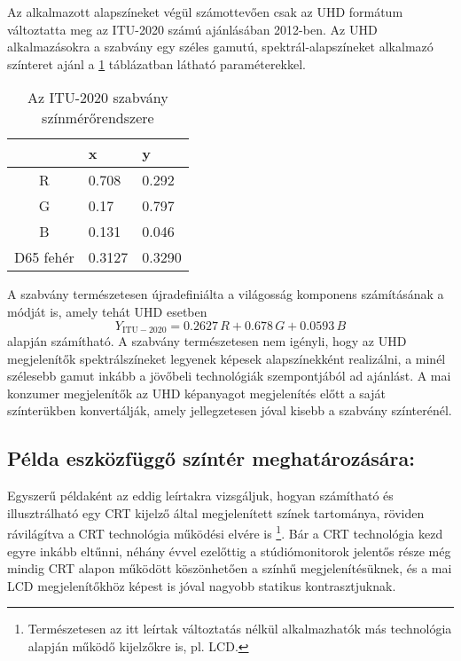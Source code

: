 Az alkalmazott alapszíneket végül számottevően csak az UHD formátum változtatta meg az ITU-2020 számú ajánlásában 2012-ben.
Az UHD alkalmazásokra a szabvány egy széles gamutú, spektrál-alapszíneket alkalmazó színteret ajánl a \ref{tab:UHDTV_colorimetry} táblázatban látható paraméterekkel. 
\begin{table}[h!]
\caption{Az ITU-2020 szabvány színmérőrendszere}
\renewcommand*{\arraystretch}{1}
\label{tab:UHDTV_colorimetry}
\begin{center}
\small\addtolength{\tabcolsep}{15pt}
    \begin{tabular}[h!]{ @{}c | | l | l @{} }%
		&   x  	&    y \\ \hline
    R   &  0.708 &	0.292  \\
    G   &  0.17 &	0.797  \\
    B   & 0.131 &	0.046 \\
    D65 fehér     &  0.3127 & 0.3290 	  \\
    \end{tabular}
\end{center}
\end{table}
A szabvány természetesen újradefiniálta a világosság komponens számításának a módját is, amely tehát UHD esetben
\begin{equation}Y_{\mathrm{ITU}-2020} = 
   0.2627\,R + 0.678 \,G + 0.0593\,B 
\label{Eq:UHD_luminance}
\end{equation}
alapján számítható.
A szabvány természetesen nem igényli, hogy az UHD megjelenítők spektrálszíneket legyenek képesek alapszínekként realizálni, a minél szélesebb gamut inkább a jövőbeli technológiák szempontjából ad ajánlást.
A mai konzumer megjelenítők az UHD képanyagot megjelenítés előtt a saját színterükben konvertálják, amely jellegzetesen jóval kisebb a szabvány színterénél.

\subsection{Példa eszközfüggő színtér meghatározására:}
\label{sec:CRT}

Egyszerű példaként az eddig leírtakra vizsgáljuk, hogyan számítható és illusztrálható egy CRT kijelző által megjelenített színek tartománya, röviden rávilágítva a CRT technológia működési elvére is \footnote{Természetesen az itt leírtak változtatás nélkül alkalmazhatók más technológia alapján működő kijelzőkre is, pl. LCD.}.
Bár a CRT technológia kezd egyre inkább eltűnni, néhány évvel ezelőttig a stúdiómonitorok jelentős része még mindig CRT alapon működött köszönhetően a színhű megjelenítésüknek, és a mai LCD megjelenítőkhöz képest is jóval nagyobb statikus kontrasztjuknak.

